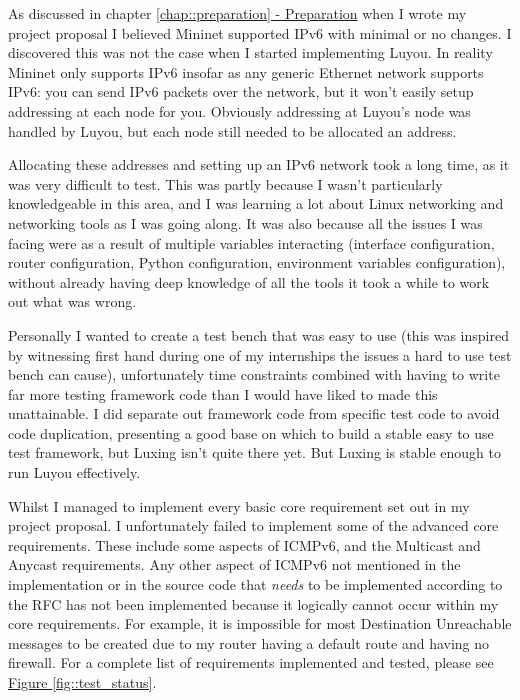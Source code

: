 \documentclass[12pt,a4paper,twoside,openany]{report}
\begin{document}
\bigskip

As discussed in chapter \ref{chap::preparation}\hyperref[chap::preparation]{ - Preparation} when I wrote my project proposal I believed Mininet supported IPv6 with minimal or no changes\cite{tw_mininet}.  I discovered this was not the case when I started implementing Luyou.  In reality Mininet only supports IPv6 insofar as any generic Ethernet network supports IPv6: you can send IPv6 packets over the network, but it won't easily setup addressing at each node for you.  Obviously addressing at Luyou's node was handled by Luyou, but each node still needed to be allocated an address. 

Allocating these addresses and setting up an IPv6 network took a long time, as it was very difficult to test.  This was partly because I wasn't particularly knowledgeable in this area, and I was learning a lot about Linux networking and networking tools as I was going along. It was also because all the issues I was facing were as a result of multiple variables interacting (interface configuration, router configuration, Python configuration, environment variables configuration), without already having deep knowledge of all the tools it took a while to work out what was wrong. 

Personally I wanted to create a test bench that was easy to use (this was inspired by witnessing first hand during one of my internships the issues a hard to use test bench can cause), unfortunately time constraints combined with having to write far more testing framework code than I would have liked to made this unattainable.  I did separate out framework code from specific test code to avoid code duplication, presenting a good base on which to build a stable easy to use test framework, but Luxing isn't quite there yet. But Luxing is stable enough to run Luyou effectively.

\bigskip

Whilst I managed to implement every basic core requirement set out in my project proposal. I unfortunately failed to implement some of the advanced core requirements. These include some aspects of ICMPv6, and the Multicast and Anycast requirements. Any other aspect of ICMPv6 not mentioned in the implementation or in the source code that \textit{needs} to be implemented according to the RFC has not been implemented because it logically cannot occur within my core requirements.  For example, it is impossible for most Destination Unreachable messages to be created due to my router having a default route and having no firewall.  For a complete list of requirements implemented and tested, please see \hyperref[fig::test_status]{Figure }\ref{fig::test_status}.
\end{document}
